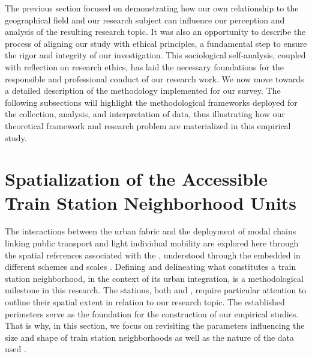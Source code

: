 \begin{refsegment}
The previous section focused on demonstrating how our own relationship to the geographical field and our research subject can influence our perception and analysis of the resulting research topic. It was also an opportunity to describe the process of aligning our study with ethical principles, a fundamental step to ensure the rigor and integrity of our investigation. This sociological self-analysis, coupled with reflection on research ethics, has laid the necessary foundations for the responsible and professional conduct of our research work. We now move towards a detailed description of the methodology implemented for our survey. The following subsections will highlight the methodological frameworks deployed for the collection, analysis, and interpretation of data, thus illustrating how our theoretical framework and research problem are materialized in this empirical study.%

\newpage
{} %
\section{Spatialization of the Accessible Train Station Neighborhood Units
    \label{chap3:quartiers-gare}
    }

The interactions between the urban fabric and the deployment of modal chains linking public transport and light individual mobility are explored here through the spatial references associated with the , understood through the  embedded in different schemes and scales \textcolor{blue}{\autocite[14]{menerault_gares_2001}}. Defining and delineating what constitutes a train station neighborhood, in the context of its urban integration, is a methodological milestone in this research. The stations, both  and  \textcolor{blue}{\autocite[40]{serviant_gare_2015}}, require particular attention to outline their spatial extent in relation to our research topic. The established perimeters serve as the foundation for the construction of our empirical studies. That is why, in this section, we focus on revisiting the parameters influencing the size and shape of train station neighborhoods as well as the nature of the data used \textcolor{blue}{\autocite[383]{forsch_metrochrones_2023}}.%


\end{refsegment}
